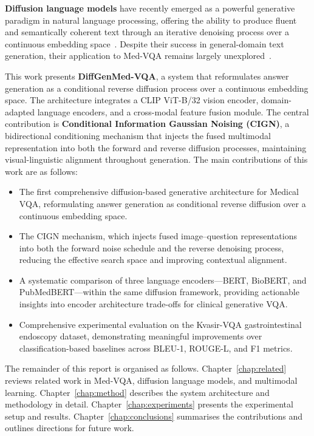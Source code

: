 \documentclass[9pt]{report}
\begin{document}
\textbf{Diffusion language models} have recently emerged as a powerful generative paradigm in natural language processing, offering the ability to produce fluent and semantically coherent text through an iterative denoising process over a continuous embedding space~\cite{diffusionlm,diffuseq}. Despite their success in general-domain text generation, their application to Med-VQA remains largely unexplored~\cite{diffuvqa}.

This work presents \textbf{DiffGenMed-VQA}, a system that reformulates answer generation as a conditional reverse diffusion process over a continuous embedding space. The architecture integrates a CLIP ViT-B/32 vision encoder, domain-adapted language encoders, and a cross-modal feature fusion module. The central contribution is \textbf{Conditional Information Gaussian Noising (CIGN)}, a bidirectional conditioning mechanism that injects the fused multimodal representation into both the forward and reverse diffusion processes, maintaining visual-linguistic alignment throughout generation. The main contributions of this work are as follows:

\begin{itemize}
    \item The first comprehensive diffusion-based generative architecture for Medical VQA, reformulating answer generation as conditional reverse diffusion over a continuous embedding space.
    \item The CIGN mechanism, which injects fused image--question representations into both the forward noise schedule and the reverse denoising process, reducing the effective search space and improving contextual alignment.
    \item A systematic comparison of three language encoders---BERT, BioBERT, and PubMedBERT---within the same diffusion framework, providing actionable insights into encoder architecture trade-offs for clinical generative VQA.
    \item Comprehensive experimental evaluation on the Kvasir-VQA gastrointestinal endoscopy dataset, demonstrating meaningful improvements over classification-based baselines across BLEU-1, ROUGE-L, and F1 metrics.
\end{itemize}

The remainder of this report is organised as follows. Chapter~\ref{chap:related} reviews related work in Med-VQA, diffusion language models, and multimodal learning. Chapter~\ref{chap:method} describes the system architecture and methodology in detail. Chapter~\ref{chap:experiments} presents the experimental setup and results. Chapter~\ref{chap:conclusions} summarises the contributions and outlines directions for future work.
\end{document}

